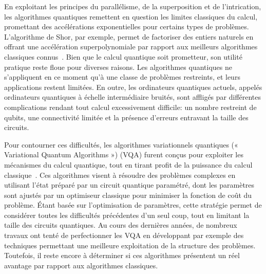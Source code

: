 \Introduction   %


En exploitant les principes du parallélisme, de la superposition et de l'intrication, les algorithmes quantiques remettent en question les limites classiques du calcul, promettant des accélérations exponentielles pour certains types de problèmes. L'algorithme de Shor, par exemple, permet de factoriser des entiers naturels en offrant une accélération superpolynomiale par rapport aux 
meilleurs algorithmes classiques connus~\cite{shorAlgorithmsQuantumComputation1994}. Bien que le calcul quantique soit prometteur, son utilité pratique reste floue pour diverses raisons. Les algorithmes quantiques ne s'appliquent en ce moment qu'à une classe de problèmes restreints, et leurs applications restent limitées. En outre, les ordinateurs quantiques actuels, appelés ordinateurs quantiques à échelle intermédiaire bruités, sont affligés par différentes complications rendant tout calcul excessivement difficile: un nombre restreint de qubits, une connectivité limitée et la présence d'erreurs entravant la taille des circuits.

Pour contourner ces difficultés, les algorithmes variationnels quantiques (« Variational Quantum Algorithms ») (VQA) furent conçus pour exploiter les mécanismes du calcul quantique, tout en tirant profit de la puissance du calcul classique~\cite{cerezoVariationalQuantumAlgorithms2021}. Ces algorithmes visent à résoudre des problèmes complexes en utilisant l'état préparé par un circuit quantique paramétré, dont les paramètres sont ajustés par un optimiseur classique pour minimiser la fonction de coût du problème. Étant basée sur l'optimisation de paramètres, cette stratégie permet de considérer toutes les difficultés précédentes d'un seul coup, tout en limitant la taille des circuits quantiques. Au cours des dernières années, de nombreux travaux ont tenté de perfectionner les VQA en développant par exemple des techniques permettant une meilleure exploitation de la structure des problèmes. Toutefois, il reste encore à déterminer si ces algorithmes présentent un réel avantage par rapport aux algorithmes classiques.  

